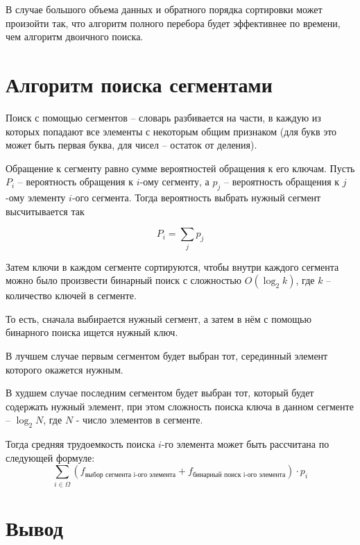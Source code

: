 \documentclass[a4paper,14pt, unknownkeysallowed]{extreport}
\begin{document}
В случае большого объема данных и обратного порядка сортировки может произойти так, что алгоритм полного перебора будет эффективнее по времени, чем алгоритм двоичного поиска.

\clearpage

\section{Алгоритм поиска сегментами}

Поиск с помощью сегментов -- словарь разбивается на части, в каждую из которых попадают все элементы с некоторым общим признаком (для букв это может быть первая буква, для чисел -- остаток от деления).

Обращение к сегменту равно сумме вероятностей обращения к его ключам. Пусть $P_i$ -- вероятность обращения к $i$-ому сегменту, а $p_j$ -- вероятность обращения к $j$-ому элементу $i$-ого сегмента. Тогда вероятность выбрать нужный сегмент высчитывается так 

\begin{equation}
	P_i = \sum_j p_j
\end{equation}

Затем ключи в каждом сегменте сортируются, чтобы внутри каждого сегмента можно было произвести бинарный поиск с сложностью $O(\log_2 k)$, где $k$ -- количество ключей в сегменте.

То есть, сначала выбирается нужный сегмент, а затем в нём с помощью бинарного поиска ищется нужный ключ.

В лучшем случае первым сегментом будет выбран тот, серединный элемент которого окажется нужным.

В худшем случае последним сегментом будет выбран тот, который будет содержать нужный элемент, при этом сложность поиска ключа в данном сегменте -- $\log_2 N$, где $N$ - число элементов в сегменте.

Тогда средняя трудоемкость поиска $i$-го элемента может быть рассчитана по следующей формуле:
\begin{equation}
	\sum_{i \in \Omega}{\left(f_{\text{выбор сегмента i-ого элемента}} + f_{\text{бинарный поиск i-ого элемента}}\right)} \cdot p_i
\end{equation}

\clearpage

\section{Вывод}
\end{document}
